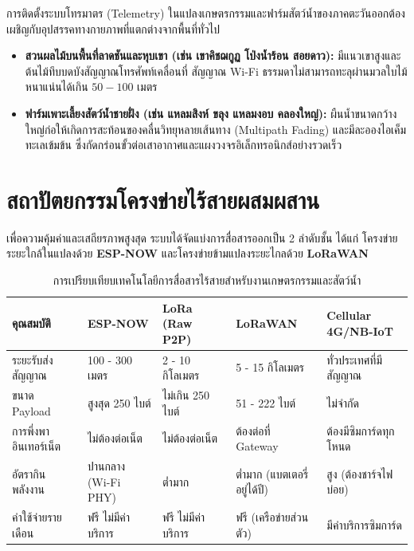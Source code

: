การติดตั้งระบบโทรมาตร (Telemetry) ในแปลงเกษตรกรรมและฟาร์มสัตว์น้ำของภาคตะวันออกต้องเผชิญกับอุปสรรคทางกายภาพที่แตกต่างจากพื้นที่ทั่วไป
\begin{itemize}[leftmargin=1.5em]
    \item \textbf{สวนผลไม้บนพื้นที่ลาดชันและหุบเขา (เช่น เขาคิชฌกูฏ โป่งน้ำร้อน สอยดาว):} มีแนวเขาสูงและต้นไม้ทึบบดบังสัญญาณโทรศัพท์เคลื่อนที่ สัญญาณ Wi-Fi ธรรมดาไม่สามารถทะลุผ่านมวลใบไม้หนาแน่นได้เกิน $50 - 100\text{ เมตร}$
    \item \textbf{ฟาร์มเพาะเลี้ยงสัตว์น้ำชายฝั่ง (เช่น แหลมสิงห์ ขลุง แหลมงอบ คลองใหญ่):} ผืนน้ำขนาดกว้างใหญ่ก่อให้เกิดการสะท้อนของคลื่นวิทยุหลายเส้นทาง (Multipath Fading) และมีละอองไอเค็มทะเลเข้มข้น ซึ่งกัดกร่อนขั้วต่อเสาอากาศและแผงวงจรอิเล็กทรอนิกส์อย่างรวดเร็ว
\end{itemize}

\section{สถาปัตยกรรมโครงข่ายไร้สายผสมผสาน}

เพื่อความคุ้มค่าและเสถียรภาพสูงสุด ระบบได้จัดแบ่งการสื่อสารออกเป็น 2 ลำดับชั้น ได้แก่ โครงข่ายระยะใกล้ในแปลงด้วย \textbf{ESP-NOW} และโครงข่ายข้ามแปลงระยะไกลด้วย \textbf{LoRaWAN}

\begin{table}[H]
\centering
\caption{การเปรียบเทียบเทคโนโลยีการสื่อสารไร้สายสำหรับงานเกษตรกรรมและสัตว์น้ำ}
\label{tab:wireless_comparison}
\begin{tabularx}{\textwidth}{p{3.2cm}YYYY}
    \toprule
    \textbf{คุณสมบัติ} & \textbf{ESP-NOW} & \textbf{LoRa (Raw P2P)} & \textbf{LoRaWAN} & \textbf{Cellular 4G/NB-IoT} \\
    \midrule
    ระยะรับส่งสัญญาณ & 100 - 300 เมตร & 2 - 10 กิโลเมตร & 5 - 15 กิโลเมตร & ทั่วประเทศที่มีสัญญาณ \\
    ขนาด Payload & สูงสุด 250 ไบต์ & ไม่เกิน 250 ไบต์ & 51 - 222 ไบต์ & ไม่จำกัด \\
    การพึ่งพาอินเทอร์เน็ต & ไม่ต้องต่อเน็ต & ไม่ต้องต่อเน็ต & ต้องต่อที่ Gateway & ต้องมีซิมการ์ดทุกโหนด \\
    อัตรากินพลังงาน & ปานกลาง (Wi-Fi PHY) & ต่ำมาก & ต่ำมาก (แบตเตอรี่อยู่ได้ปี) & สูง (ต้องชาร์จไฟบ่อย) \\
    ค่าใช้จ่ายรายเดือน & ฟรี ไม่มีค่าบริการ & ฟรี ไม่มีค่าบริการ & ฟรี (เครือข่ายส่วนตัว) & มีค่าบริการซิมการ์ด \\
    \bottomrule
\end{tabularx}
\end{table}


